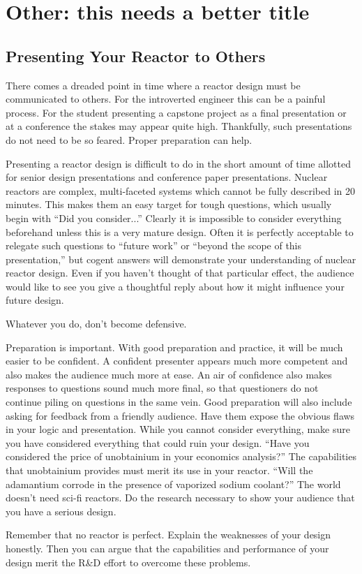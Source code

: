 \chapter{Other: this needs a better title}

\section{Presenting Your Reactor to Others}
There comes a dreaded point in time where a reactor design must be communicated to others.
For the introverted engineer this can be a painful process.
For the student presenting a capstone project as a final presentation or at a conference the stakes may appear quite high.
Thankfully, such presentations do not need to be so feared. Proper preparation can help.

Presenting a reactor design is difficult to do in the short amount of time allotted for senior design presentations and conference paper presentations. 
Nuclear reactors are complex, multi-faceted systems which cannot be fully described in 20 minutes. This makes them an easy target for tough questions, which usually begin with ``Did you consider...'' 
Clearly it is impossible to consider everything beforehand unless this is a very mature design. 
Often it is perfectly acceptable to relegate such questions to ``future work'' or ``beyond the scope of this presentation,'' but cogent answers will demonstrate your understanding of nuclear reactor design. Even if you haven't thought of that particular effect, the audience would like to see you give a thoughtful reply about how it might influence your future design.

Whatever you do, don't become defensive.

Preparation is important. With good preparation and practice, it will be much easier to be confident. A confident presenter appears much more competent and also makes the audience much more at ease. An air of confidence also makes responses to questions sound much more final, so that questioners do not continue piling on questions in the same vein.
Good preparation will also include asking for feedback from a friendly audience. 
Have them expose the obvious flaws in your logic and presentation.
While you cannot consider everything, make sure you have considered everything that could ruin your design. ``Have you considered the price of unobtainium in your economics analysis?''
The capabilities that unobtainium provides must merit its use in your reactor. 
``Will the adamantium corrode in the presence of vaporized sodium coolant?'' The world doesn't need sci-fi reactors. Do the research necessary to show your audience that you have a serious design. 

Remember that no reactor is perfect. Explain the weaknesses of your design honestly.
Then you can argue that the capabilities and performance of your design merit the R\&D effort to overcome these problems.
